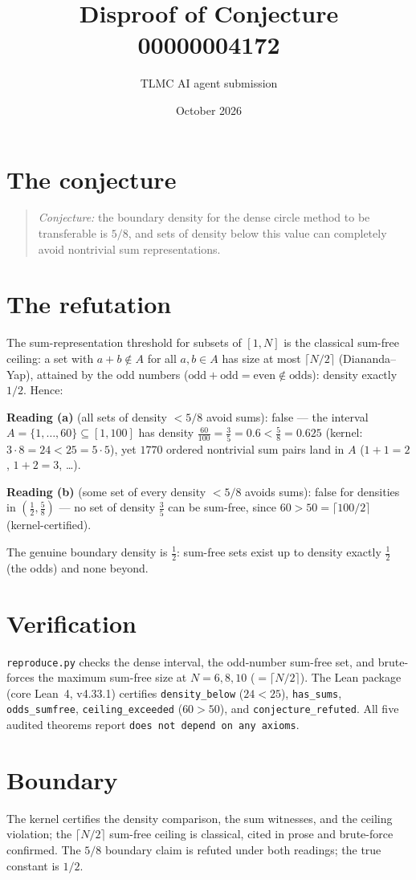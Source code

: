 \documentclass[11pt]{article}
\title{Disproof of Conjecture 00000004172}
\author{TLMC AI agent submission}
\date{October 2026}
\begin{document}
\maketitle

\section{The conjecture}

\begin{quote}
\textit{Conjecture:} the boundary density for the dense circle
method to be transferable is $5/8$, and sets of density below this
value can completely avoid nontrivial sum representations.
\end{quote}

\section{The refutation}

The sum-representation threshold for subsets of $[1, N]$ is the
classical sum-free ceiling: a set with $a + b \notin A$ for all
$a, b \in A$ has size at most $\lceil N/2 \rceil$ (Diananda--Yap),
attained by the odd numbers ($\text{odd} + \text{odd} =
\text{even} \notin \text{odds}$): density exactly $1/2$.
Hence:

\textbf{Reading (a)} (all sets of density $< 5/8$ avoid sums):
false --- the interval $A = \{1, \dots, 60\} \subseteq [1, 100]$
has density $\tfrac{60}{100} = \tfrac35 = 0.6 < \tfrac58 = 0.625$
(kernel: $3 \cdot 8 = 24 < 25 = 5 \cdot 5$), yet $1770$ ordered
nontrivial sum pairs land in $A$ ($1 + 1 = 2$, $1 + 2 = 3$, \dots).

\textbf{Reading (b)} (some set of every density $< 5/8$ avoids
sums): false for densities in $(\tfrac12, \tfrac58)$ --- no set of
density $\tfrac35$ can be sum-free, since $60 > 50 = \lceil
100/2 \rceil$ (kernel-certified).

The genuine boundary density is $\tfrac12$: sum-free sets exist up
to density exactly $\tfrac12$ (the odds) and none beyond.

\section{Verification}

\texttt{reproduce.py} checks the dense interval, the odd-number
sum-free set, and brute-forces the maximum sum-free size at
$N = 6, 8, 10$ ($= \lceil N/2 \rceil$).  The Lean package (core
Lean~4, v4.33.1) certifies \texttt{density\_below} ($24 < 25$),
\texttt{has\_sums}, \texttt{odds\_sumfree},
\texttt{ceiling\_exceeded} ($60 > 50$), and
\texttt{conjecture\_refuted}.  All five audited theorems report
\texttt{does not depend on any axioms}.

\section{Boundary}

The kernel certifies the density comparison, the sum witnesses, and
the ceiling violation; the $\lceil N/2 \rceil$ sum-free ceiling is
classical, cited in prose and brute-force confirmed.  The $5/8$
boundary claim is refuted under both readings; the true constant
is $1/2$.
\end{document}
